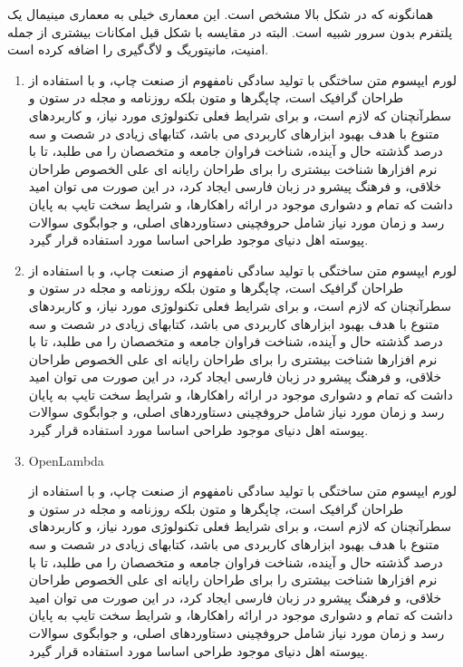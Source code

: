 همانگونه که در شکل بالا مشخص است. این معماری خیلی به معماری مینیمال یک پلتفرم بدون سرور شبیه است. البته در مقایسه با شکل قبل امکانات بیشتری از جمله امنیت، مانیتوریگ و لاگ‌گیری را اضافه کرده است. 

\begin{enumerate}
	\item {}
	
	لورم ایپسوم متن ساختگی با تولید سادگی نامفهوم از صنعت چاپ، و با استفاده از طراحان گرافیک است، چاپگرها و متون بلکه روزنامه و مجله در ستون و سطرآنچنان که لازم است، و برای شرایط فعلی تکنولوژی مورد نیاز، و کاربردهای متنوع با هدف بهبود ابزارهای کاربردی می باشد، کتابهای زیادی در شصت و سه درصد گذشته حال و آینده، شناخت فراوان جامعه و متخصصان را می طلبد، تا با نرم افزارها شناخت بیشتری را برای طراحان رایانه ای علی الخصوص طراحان خلاقی، و فرهنگ پیشرو در زبان فارسی ایجاد کرد، در این صورت می توان امید داشت که تمام و دشواری موجود در ارائه راهکارها، و شرایط سخت تایپ به پایان رسد و زمان مورد نیاز شامل حروفچینی دستاوردهای اصلی، و جوابگوی سوالات پیوسته اهل دنیای موجود طراحی اساسا مورد استفاده قرار گیرد.
	\item {}
	
	لورم ایپسوم متن ساختگی با تولید سادگی نامفهوم از صنعت چاپ، و با استفاده از طراحان گرافیک است، چاپگرها و متون بلکه روزنامه و مجله در ستون و سطرآنچنان که لازم است، و برای شرایط فعلی تکنولوژی مورد نیاز، و کاربردهای متنوع با هدف بهبود ابزارهای کاربردی می باشد، کتابهای زیادی در شصت و سه درصد گذشته حال و آینده، شناخت فراوان جامعه و متخصصان را می طلبد، تا با نرم افزارها شناخت بیشتری را برای طراحان رایانه ای علی الخصوص طراحان خلاقی، و فرهنگ پیشرو در زبان فارسی ایجاد کرد، در این صورت می توان امید داشت که تمام و دشواری موجود در ارائه راهکارها، و شرایط سخت تایپ به پایان رسد و زمان مورد نیاز شامل حروفچینی دستاوردهای اصلی، و جوابگوی سوالات پیوسته اهل دنیای موجود طراحی اساسا مورد استفاده قرار گیرد.
	
	\item {OpenLambda}
	
	لورم ایپسوم متن ساختگی با تولید سادگی نامفهوم از صنعت چاپ، و با استفاده از طراحان گرافیک است، چاپگرها و متون بلکه روزنامه و مجله در ستون و سطرآنچنان که لازم است، و برای شرایط فعلی تکنولوژی مورد نیاز، و کاربردهای متنوع با هدف بهبود ابزارهای کاربردی می باشد، کتابهای زیادی در شصت و سه درصد گذشته حال و آینده، شناخت فراوان جامعه و متخصصان را می طلبد، تا با نرم افزارها شناخت بیشتری را برای طراحان رایانه ای علی الخصوص طراحان خلاقی، و فرهنگ پیشرو در زبان فارسی ایجاد کرد، در این صورت می توان امید داشت که تمام و دشواری موجود در ارائه راهکارها، و شرایط سخت تایپ به پایان رسد و زمان مورد نیاز شامل حروفچینی دستاوردهای اصلی، و جوابگوی سوالات پیوسته اهل دنیای موجود طراحی اساسا مورد استفاده قرار گیرد.
	
\end{enumerate}

